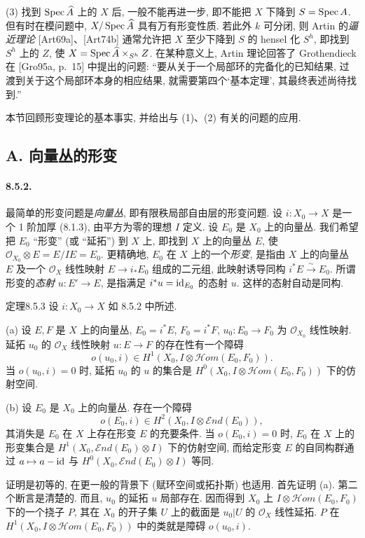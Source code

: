 (3) 找到 $\operatorname{Spec}\widehat A$ 上的 $X$ 后, 一般不能再进一步, 即不能把 $X$ 下降到 $S=\operatorname{Spec} A$. 但有时在模问题中, $X/\operatorname{Spec}\widehat A$ 具有万有形变性质. 若此外 $k$ 可分闭, 则 Artin 的\emph{逼近理论} [Art69a]、[Art74b] 通常允许把 $X$ 至少下降到 $S$ 的 hensel 化 $S^h$, 即找到 $S^h$ 上的 $Z$, 使 $X=\operatorname{Spec}\widehat A\times_{S^h}Z$. 在某种意义上, Artin 理论回答了 Grothendieck 在 [Gro95a, p.~15] 中提出的问题: ``要从关于一个局部环的完备化的已知结果, 过渡到关于这个局部环本身的相应结果, 就需要第四个‘基本定理’, 其最终表述尚待找到.''

本节回顾形变理论的基本事实, 并给出与 (1)、(2) 有关的问题的应用.

\subsection*{A. 向量丛的形变}
\paragraph{8.5.2.}
最简单的形变问题是\emph{向量丛}, 即有限秩局部自由层的形变问题. 设 $i:X_0\to X$ 是一个 1 阶加厚 (8.1.3), 由平方为零的理想 $I$ 定义. 设 $E_0$ 是 $X_0$ 上的向量丛. 我们希望把 $E_0$ ``形变'' (或 ``延拓'') 到 $X$ 上, 即找到 $X$ 上的向量丛 $E$,
使 $\mathcal O_{X_0}\otimes E=E/IE=E_0$. 更精确地, $E_0$ 在 $X$ 上的一个\emph{形变}, 是指由 $X$ 上的向量丛 $E$ 及一个 $\mathcal O_X$ 线性映射 $E\to i_*E_0$ 组成的二元组, 此映射诱导同构 $i^*E\xrightarrow\sim E_0$. 所谓形变的\emph{态射} $u:E'\to E$, 是指满足 $i^*u=\mathrm{id}_{E_0}$ 的态射 $u$. 这样的态射自动是同构.

\begin{origstatement}{定理}{8.5.3}\label{ch08:th853}
设 $i:X_0\to X$ 如 8.5.2 中所述.

(a) 设 $E,F$ 是 $X$ 上的向量丛, $E_0=i^*E$, $F_0=i^*F$, $u_0:E_0\to F_0$ 为 $\mathcal O_{X_0}$ 线性映射. 延拓 $u_0$ 的 $\mathcal O_X$ 线性映射 $u:E\to F$ 的存在性有一个障碍
\[o(u_0,i)\in H^1(X_0,I\otimes\mathcal Hom(E_0,F_0)).\]
当 $o(u_0,i)=0$ 时, 延拓 $u_0$ 的 $u$ 的集合是 $H^0(X_0,I\otimes\mathcal Hom(E_0,F_0))$ 下的仿射空间.

(b) 设 $E_0$ 是 $X_0$ 上的向量丛. 存在一个障碍
\[o(E_0,i)\in H^2(X_0,I\otimes\mathcal End(E_0)),\]
其消失是 $E_0$ 在 $X$ 上存在形变 $E$ 的充要条件. 当 $o(E_0,i)=0$ 时, $E_0$ 在 $X$ 上的形变集合是 $H^1(X_0,\mathcal End(E_0)\otimes I)$ 下的仿射空间, 而给定形变 $E$ 的自同构群通过 $a\mapsto a-\mathrm{id}$ 与 $H^0(X_0,\mathcal End(E_0)\otimes I)$ 等同.
\end{origstatement}
证明是初等的, 在更一般的背景下 (赋环空间或拓扑斯) 也适用. 首先证明 (a). 第二个断言是清楚的. 而且, $u_0$ 的延拓 $u$ 局部存在. 因而得到 $X_0$ 上 $I\otimes\mathcal Hom(E_0,F_0)$ 下的一个挠子 $P$, 其在 $X_0$ 的开子集 $U$ 上的截面是 $u_0|U$ 的 $\mathcal O_X$ 线性延拓. $P$ 在 $H^1(X_0,I\otimes\mathcal Hom(E_0,F_0))$ 中的类就是障碍 $o(u_0,i)$.

